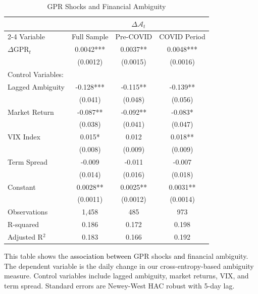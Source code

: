 \documentclass[preprint,12pt,authoryear]{elsarticle}
\begin{document}
\begin{table}[htbp]
\centering
\caption{GPR Shocks and Financial Ambiguity}
\label{tab:gpr_ambiguity}
\begin{threeparttable}
\begin{tabular*}{\textwidth}{@{\extracolsep{\fill}} lccc @{\extracolsep{\fill}}}
\toprule
& \multicolumn{3}{c}{$\Delta \mathcal{A}_{t}$} \\
\cmidrule(lr){2-4}
Variable & Full Sample & Pre-COVID & COVID Period \\
\midrule
\midrule
$\Delta$GPR$_t$ & 0.0042*** & 0.0037** & 0.0048*** \\
& (0.0012) & (0.0015) & (0.0016) \\
\midrule
Control Variables: & & & \\
Lagged Ambiguity & -0.128*** & -0.115** & -0.139** \\
& (0.041) & (0.048) & (0.056) \\
Market Return & -0.087** & -0.092** & -0.083* \\
& (0.038) & (0.041) & (0.047) \\
VIX Index & 0.015* & 0.012 & 0.018** \\
& (0.008) & (0.009) & (0.009) \\
Term Spread & -0.009 & -0.011 & -0.007 \\
& (0.014) & (0.016) & (0.018) \\
\midrule
Constant & 0.0028** & 0.0025** & 0.0031** \\
& (0.0011) & (0.0012) & (0.0014) \\
\midrule
Observations & 1,458 & 485 & 973 \\
R-squared & 0.186 & 0.172 & 0.198 \\
Adjusted R$^2$ & 0.183 & 0.166 & 0.192 \\
\bottomrule
\end{tabular*}
\begin{tablenotes}[flushleft]
\small
\item[] This table shows the \textcolor{black}{association between} GPR shocks \textcolor{black}{and} financial ambiguity. The dependent variable is the daily change in our cross-entropy-based ambiguity measure. Control variables include lagged ambiguity, market returns, VIX, and term spread. Standard errors are Newey-West HAC robust with 5-day lag.
\end{tablenotes}
\end{threeparttable}
\end{table}
\end{document}
